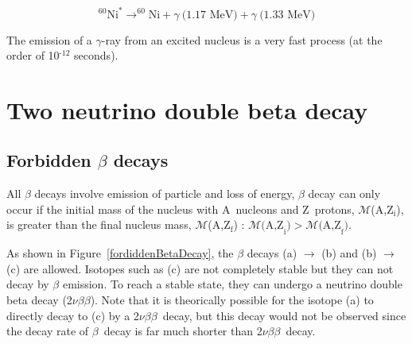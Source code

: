 \documentclass[main.tex]{subfiles}
\begin{document}
\begin{equation}
^{\text{60}}\text{Ni}^\ast \rightarrow ^{\text{60}}\text{Ni} + \gamma~\text{(1.17~MeV)} + \gamma~\text{(1.33~MeV)}
\end{equation}


\NI The emission of a $\gamma$-ray from an excited nucleus is a very fast process (at the order of 10$^{\text{-12}}$ seconds). 


\section{Two neutrino double beta decay}\label{sec:2nubb}


\subsection{Forbidden $\beta$ decays}


\NI All $\beta$ decays involve emission of particle and loss of energy, $\beta$ decay can only occur if the initial mass of the nucleus with A~nucleons and Z~protons, $\mathcal{M}$(A,Z$_\text{i}$), is greater than the final nucleus mass, $\mathcal{M}$(A,Z$_\text{f}$) : $\mathcal{M} \text{(A,Z}_\text{i}) > \mathcal{M} \text{(A,Z}_\text{f})$.


\bigskip


\NI As shown in Figure~\ref{fordiddenBetaDecay}, the $\beta$ decays (a) $\rightarrow$ (b) and (b) $\rightarrow$ (c) are allowed. Isotopes such as (c) are not completely stable but they can not decay by $\beta$ emission. To reach a stable state, they can undergo a neutrino double beta decay (2$\nu\beta\beta$). Note that it is theorically possible for the isotope (a) to directly decay to (c) by a 2$\nu\beta\beta$~decay, but this decay would not be observed since the decay rate of $\beta$~decay is far much shorter than 2$\nu\beta\beta$~decay.
\end{document}
